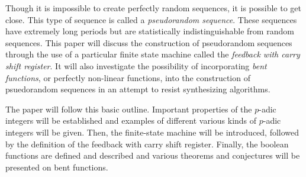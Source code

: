 \par Though it is impossible to create perfectly random sequences, it is possible to get close.
This type of sequence is called a {\em pseudorandom sequence}. These sequences have extremely
long periods but are statistically indistinguishable from random sequences. This paper will discuss
the construction of pseudorandom sequences through the use of a particular finite state machine
called the {\em feedback with carry shift register}. It will also investigate the possibility of
incorporating {\em bent functions}, or perfectly non-linear functions, into the construction of
psuedorandom sequences in an attempt to resist synthesizing algorithms. 

\par The paper will follow this basic outline. Important properties of the $p$-adic integers
will be established and examples of different various kinds of $p$-adic integers will be given. 
Then, the finite-state machine will be introduced, followed by the definition of the feedback
with carry shift register. Finally, the boolean functions are defined and described and various
theorems and conjectures will be presented on bent functions.
